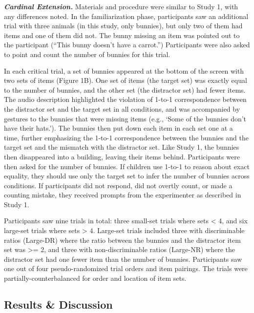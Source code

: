 \documentclass[10pt, letterpaper]{article}
\begin{document}
\textbf{\emph{Cardinal Extension.}} Materials and procedure were similar
to Study 1, with any differences noted. In the familiarization phase,
participants saw an additional trial with three animals (in this study,
only bunnies), but only two of them had items and one of them did not.
The bunny missing an item was pointed out to the participant (``This
bunny doesn't have a carrot.'') Participants were also asked to point
and count the number of bunnies for this trial.

In each critical trial, a set of bunnies appeared at the bottom of the
screen with two sets of items (Figure 1B). One set of items (the target
set) was exactly equal to the number of bunnies, and the other set (the
distractor set) had fewer items. The audio description highlighted the
violation of 1-to-1 correspondence between the distractor set and the
target set in all conditions, and was accompanied by gestures to the
bunnies that were missing items (e.g., `Some of the bunnies don't have
their hats.'). The bunnies then put down each item in each set one at a
time, further emphasizing the 1-to-1 correspondence between the bunnies
and the target set and the mismatch with the distractor set. Like Study
1, the bunnies then disappeared into a building, leaving their items
behind. Participants were then asked for the number of bunnies. If
children use 1-to-1 to reason about exact equality, they should use only
the target set to infer the number of bunnies across conditions. If
participants did not respond, did not overtly count, or made a counting
mistake, they received prompts from the experimenter as described in
Study 1.

Participants saw nine trials in total: three small-set trials where sets
\textless{} 4, and six large-set trials where sets \textgreater{} 4.
Large-set trials included three with discriminable ratios (Large-DR)
where the ratio between the bunnies and the distractor item set was
\textgreater= 2, and three with non-discriminable ratios (Large-NR)
where the distractor set had one fewer item than the number of bunnies.
Participants saw one out of four pseudo-randomized trial orders and item
pairings. The trials were partially-counterbalanced for order and
location of item sets.

\hypertarget{results-discussion-1}{%
\subsection{Results \& Discussion}\label{results-discussion-1}}
\end{document}
